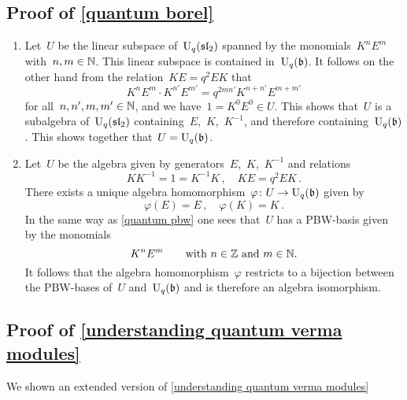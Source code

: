 \documentclass[a4paper, 11pt, oneside]{scrartcl}
\begin{document}
\subsection{Proof of \cref{quantum borel}}
\label{proof of quantum borel}

\begin{enumerate}
  \item
    Let~$U$ be the linear subspace of~$\operatorname{U}_q(\mathfrak{sl}_2)$ spanned by the monomials~$K^n E^m$ with~$n, m \in \mathbb{N}$.
    This linear subspace is contained in~$\operatorname{U}_q(\mathfrak{b})$.
    It follows on the other hand from the relation~$KE = q^2 EK$ that
    \[
      K^n E^m \cdot K^{n'} E^{m'}
      =
      q^{2 m n'} K^{n + n'} E^{m + m'}
    \]
    for all~$n, n', m, m' \in \mathbb{N}$, and we have~$1 = K^0 E^0 \in U$.
    This shows that~$U$ is a subalgebra of~$\operatorname{U}_q(\mathfrak{sl}_2)$ containing~$E$,~$K$,~$K^{-1}$, and therefore containing~$\operatorname{U}_q(\mathfrak{b})$.
    This shows together that~$U = \operatorname{U}_q(\mathfrak{b})$.
  \item
    Let~$U$ be the algebra given by generators~$E$,~$K$,~$K^{-1}$ and relations
    \[
      K K^{-1} = 1 = K^{-1} K \,,
      \quad
      KE = q^2 EK \,.
    \]
    There exists a unique algebra homomorphism~$\varphi \colon U \to \operatorname{U}_q(\mathfrak{b})$ given by
    \[
      \varphi(E) = E \,,
      \quad
      \varphi(K) = K \,.
    \]
    In the same way as \cref{quantum pbw} one sees that~$U$ has a PBW-basis given by the monomials
    \[
      K^n E^m
      \qquad
      \text{with~$n \in \mathbb{Z}$ and~$m \in \mathbb{N}$.}
    \]
    It follows that the algebra homomorphism~$\varphi$ restricts to a bijection between the PBW-bases of~$U$ and~$\operatorname{U}_q(\mathfrak{b})$ and is therefore an algebra isomorphism.
\end{enumerate}



\subsection{Proof of \cref{understanding quantum verma modules}}
\label{proof of understanding quantum verma modules}

We shown an extended version of \cref{understanding quantum verma modules}
\end{document}
